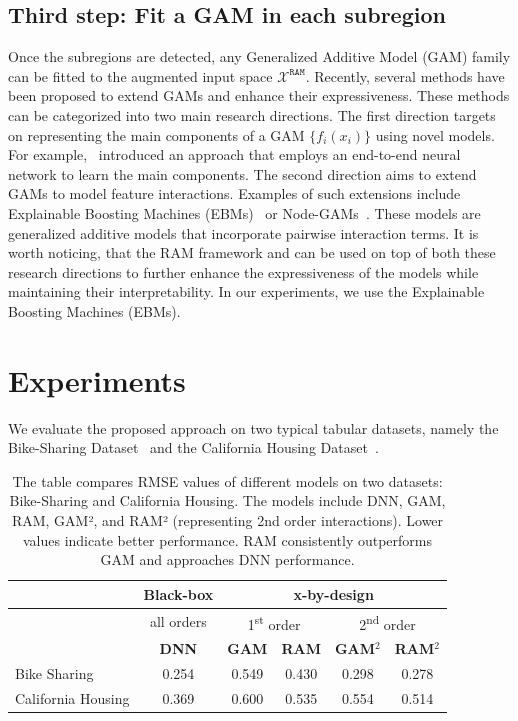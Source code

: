 \documentclass[12pt]{article}
\begin{document}
\subsection{Third step: Fit a GAM in each subregion}
\label{subsec:fitting_gams}

Once the subregions are detected, any Generalized Additive Model (GAM) family can be fitted to the augmented input space $\mathcal{X}^{\mathtt{RAM}}$.
Recently, several methods have been proposed to extend GAMs and enhance their expressiveness.
These methods can be categorized into two main research directions.
The first direction targets on representing the main components of a GAM $\{ f_i(x_i) \}$ using novel models.
For example,~\citep{agarwal2021neural} introduced an approach that employs an end-to-end neural network to learn the main components.
The second direction aims to extend GAMs to model feature interactions.
Examples of such extensions include Explainable Boosting Machines (EBMs)~\citep{lou2013accurate} or
Node-GAMs~\citep{chang2021node}.
These models are generalized additive models that incorporate pairwise interaction terms.
It is worth noticing, that the RAM framework and can be used on top of both these research directions
to further enhance the expressiveness of the models while maintaining their interpretability.
In our experiments, we use the Explainable Boosting Machines (EBMs).


\section{Experiments}

We evaluate the proposed approach on two typical tabular datasets, namely the Bike-Sharing Dataset~\citep{misc_bike_sharing_dataset_275}
and the California Housing Dataset~\citep{pace1997sparse}.


\begin{table}[htbp]
  \centering
  \caption{The table compares RMSE values of different models on two datasets: Bike-Sharing and California Housing.
  The models include DNN, GAM, RAM, GAM², and RAM² (representing 2nd order interactions).
  Lower values indicate better performance.
  RAM consistently outperforms GAM and approaches DNN performance.}
  \label{tab:sample}
  \begin{tabular}{l|c|cccc}
      \hline
      & \textbf{Black-box} & \multicolumn{4}{c}{\textbf{x-by-design}} \\
      \hline
      \hline
      & all orders & \multicolumn{2}{c}{1\textsuperscript{st} order} & \multicolumn{2}{c}{2\textsuperscript{nd} order} \\
      \hline
      \hline
      & \textbf{DNN} & \textbf{GAM} & \textbf{RAM} & \textbf{GAM}$^2$ & \textbf{RAM}$^2$ \\
      \hline
      Bike Sharing      & 0.254 & 0.549 & 0.430 & 0.298 & 0.278 \\
      \hline
      California Housing      & 0.369 & 0.600 & 0.535 & 0.554 & 0.514 \\
  \end{tabular}
\end{table}
\end{document}
